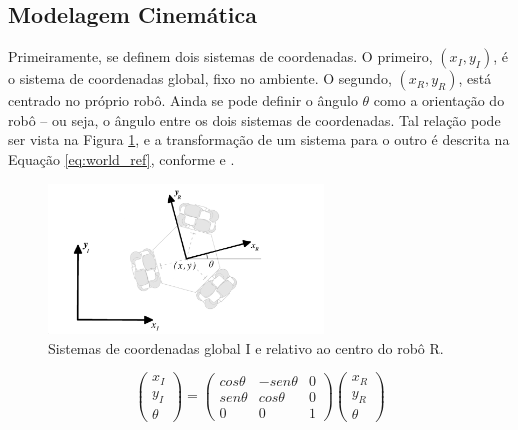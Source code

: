 \subsection{Modelagem Cinemática}

Primeiramente, se definem dois sistemas de coordenadas. O primeiro, $(x_I,y_I)$, é o sistema de coordenadas global, fixo no ambiente. O segundo, $(x_R,y_R)$, está centrado no próprio robô. Ainda se pode definir o ângulo $\theta$ como a orientação do robô -- ou seja, o ângulo entre os dois sistemas de coordenadas. Tal relação pode ser vista na Figura \ref{fig:ref}, e a transformação de um sistema para o outro é descrita na Equação \ref{eq:world_ref}, conforme \citet{siegwart2011introduction} e \citet{ritter2016modelagem}.

\begin{figure}[h]
  \centering
  \includegraphics[width = 0.65\textwidth]{imagens/ref}
  \caption{Sistemas de coordenadas global I e relativo ao centro do robô R.}
  \label{fig:ref}
\end{figure}

\begin{equation}
  \begin{pmatrix}
    x_I \\
    y_I \\
    \theta
  \end{pmatrix}
  =
  \begin{pmatrix}
    cos \theta & -sen \theta & 0 \\
    sen\theta  &  cos \theta & 0 \\
    0          & 0          & 1
  \end{pmatrix}
  \begin{pmatrix}
    x_R \\
    y_R \\
    \theta
  \end{pmatrix}
  \label{eq:world_ref}
\end{equation}


